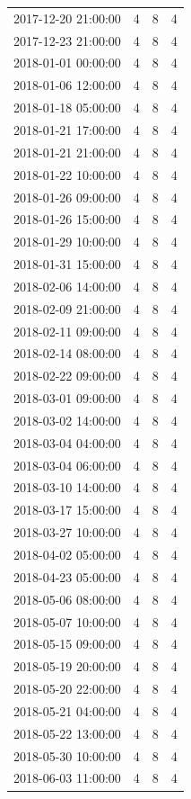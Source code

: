 \begin{tabular}{lrrr}
2017-12-20 21:00:00 & 4 & 8 & 4 \\
2017-12-23 21:00:00 & 4 & 8 & 4 \\
2018-01-01 00:00:00 & 4 & 8 & 4 \\
2018-01-06 12:00:00 & 4 & 8 & 4 \\
2018-01-18 05:00:00 & 4 & 8 & 4 \\
2018-01-21 17:00:00 & 4 & 8 & 4 \\
2018-01-21 21:00:00 & 4 & 8 & 4 \\
2018-01-22 10:00:00 & 4 & 8 & 4 \\
2018-01-26 09:00:00 & 4 & 8 & 4 \\
2018-01-26 15:00:00 & 4 & 8 & 4 \\
2018-01-29 10:00:00 & 4 & 8 & 4 \\
2018-01-31 15:00:00 & 4 & 8 & 4 \\
2018-02-06 14:00:00 & 4 & 8 & 4 \\
2018-02-09 21:00:00 & 4 & 8 & 4 \\
2018-02-11 09:00:00 & 4 & 8 & 4 \\
2018-02-14 08:00:00 & 4 & 8 & 4 \\
2018-02-22 09:00:00 & 4 & 8 & 4 \\
2018-03-01 09:00:00 & 4 & 8 & 4 \\
2018-03-02 14:00:00 & 4 & 8 & 4 \\
2018-03-04 04:00:00 & 4 & 8 & 4 \\
2018-03-04 06:00:00 & 4 & 8 & 4 \\
2018-03-10 14:00:00 & 4 & 8 & 4 \\
2018-03-17 15:00:00 & 4 & 8 & 4 \\
2018-03-27 10:00:00 & 4 & 8 & 4 \\
2018-04-02 05:00:00 & 4 & 8 & 4 \\
2018-04-23 05:00:00 & 4 & 8 & 4 \\
2018-05-06 08:00:00 & 4 & 8 & 4 \\
2018-05-07 10:00:00 & 4 & 8 & 4 \\
2018-05-15 09:00:00 & 4 & 8 & 4 \\
2018-05-19 20:00:00 & 4 & 8 & 4 \\
2018-05-20 22:00:00 & 4 & 8 & 4 \\
2018-05-21 04:00:00 & 4 & 8 & 4 \\
2018-05-22 13:00:00 & 4 & 8 & 4 \\
2018-05-30 10:00:00 & 4 & 8 & 4 \\
2018-06-03 11:00:00 & 4 & 8 & 4 \\

\end{tabular}
